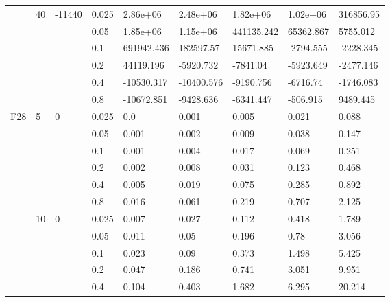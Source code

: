 \begin{longtable}{|l|l|l|l|l|l|l|l|l|}
\cmidrule{2-9} & 40  & -11440   & 0.025          & 2.86e+06   & 2.48e+06   & 1.82e+06   & 1.02e+06   & 316856.95  \\
\cmidrule{4-9} &     &          & 0.05           & 1.85e+06   & 1.15e+06   & 441135.242 & 65362.867  & 5755.012   \\
\cmidrule{4-9} &     &          & 0.1            & 691942.436 & 182597.57  & 15671.885  & -2794.555  & -2228.345  \\
\cmidrule{4-9} &     &          & 0.2            & 44119.196  & -5920.732  & -7841.04   & -5923.649  & -2477.146  \\
\cmidrule{4-9} &     &          & 0.4            & -10530.317 & -10400.576 & -9190.756  & -6716.74   & -1746.083  \\
\cmidrule{4-9} &     &          & 0.8            & -10672.851 & -9428.636  & -6341.447  & -506.915   & 9489.445   \\ \midrule
F28            & 5   & 0        & 0.025          & 0.0        & 0.001      & 0.005      & 0.021      & 0.088      \\
\cmidrule{4-9} &     &          & 0.05           & 0.001      & 0.002      & 0.009      & 0.038      & 0.147      \\
\cmidrule{4-9} &     &          & 0.1            & 0.001      & 0.004      & 0.017      & 0.069      & 0.251      \\
\cmidrule{4-9} &     &          & 0.2            & 0.002      & 0.008      & 0.031      & 0.123      & 0.468      \\
\cmidrule{4-9} &     &          & 0.4            & 0.005      & 0.019      & 0.075      & 0.285      & 0.892      \\
\cmidrule{4-9} &     &          & 0.8            & 0.016      & 0.061      & 0.219      & 0.707      & 2.125      \\
\cmidrule{2-9} & 10  & 0        & 0.025          & 0.007      & 0.027      & 0.112      & 0.418      & 1.789      \\
\cmidrule{4-9} &     &          & 0.05           & 0.011      & 0.05       & 0.196      & 0.78       & 3.056      \\
\cmidrule{4-9} &     &          & 0.1            & 0.023      & 0.09       & 0.373      & 1.498      & 5.425      \\
\cmidrule{4-9} &     &          & 0.2            & 0.047      & 0.186      & 0.741      & 3.051      & 9.951      \\
\cmidrule{4-9} &     &          & 0.4            & 0.104      & 0.403      & 1.682      & 6.295      & 20.214     \\

\end{longtable}
